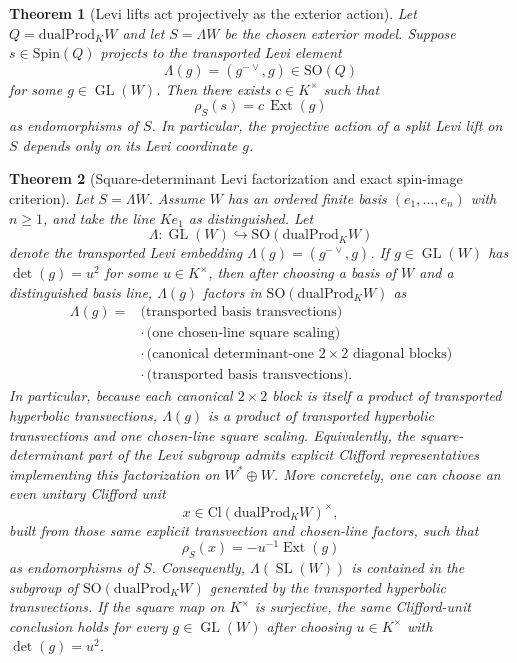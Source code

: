 \documentclass{birkjour}
\theoremstyle{plain}
\newtheorem{theorem}{Theorem}[section]
\theoremstyle{definition}
\theoremstyle{remark}
\newcommand{\Cl}{\mathrm{Cl}}
\newcommand{\Spin}{\mathrm{Spin}}
\newcommand{\SO}{\mathrm{SO}}
\newcommand{\dualProd}{\mathrm{dualProd}}
\newcommand{\ExtMap}{\operatorname{Ext}}
\newcommand{\wedgeW}{\Lambda W}
\begin{document}
\begin{theorem}[Levi lifts act projectively as the exterior action]
\label{thm:levi-projective-exterior}
Let $Q=\dualProd_K W$ and let $S=\wedgeW$ be the chosen exterior model.
Suppose $s\in \Spin(Q)$ projects to the transported Levi element
\[
  \Lambda(g)=(g^{-{\vee}},g)\in \SO(Q)
\]
for some $g\in \operatorname{GL}(W)$. Then there exists $c\in K^\times$ such that
\[
  \rho_S(s)=c\,\ExtMap(g)
\]
as endomorphisms of $S$. In particular, the projective action of a split Levi
lift on $S$ depends only on its Levi coordinate $g$.
\end{theorem}

\begin{theorem}[Square-determinant Levi factorization and exact spin-image criterion]
\label{thm:square-det-levi}
Let $S=\wedgeW$. Assume $W$ has an ordered finite basis
$(e_1,\ldots,e_n)$ with $n\ge 1$, and take the line $K e_1$ as distinguished.
Let
\[
  \Lambda:\operatorname{GL}(W)\hookrightarrow \SO(\dualProd_K W)
\]
denote the transported Levi embedding $\Lambda(g)=(g^{-{\vee}},g)$. If
$g\in \operatorname{GL}(W)$ has $\det(g)=u^2$ for some $u\in K^\times$, then
after choosing a basis of $W$ and a distinguished basis line, $\Lambda(g)$
factors in
$\SO(\dualProd_K W)$ as
\[
  \begin{aligned}
  \Lambda(g) ={}&
    \text{(transported basis transvections)} \\
    &\cdot\, \text{(one chosen-line square scaling)} \\
    &\cdot\, \text{(canonical determinant-one $2\times 2$ diagonal blocks)} \\
    &\cdot\, \text{(transported basis transvections)}.
  \end{aligned}
\]
In particular, because each canonical $2\times2$ block is itself a product of
transported hyperbolic transvections, $\Lambda(g)$ is a product of transported
hyperbolic transvections and one chosen-line square scaling. Equivalently, the
square-determinant part of the Levi subgroup admits explicit Clifford
representatives implementing this factorization on $W^*\oplus W$. More
concretely,
one can choose an even unitary Clifford unit
\[
  x\in \Cl(\dualProd_K W)^\times,
\]
built from those same explicit transvection and chosen-line factors, such that
\[
  \rho_S(x)=-u^{-1}\ExtMap(g)
\]
as endomorphisms of $S$. Consequently, $\Lambda(\operatorname{SL}(W))$ is
contained in the subgroup of
$\SO(\dualProd_K W)$ generated by the transported hyperbolic transvections.
If the square map on $K^\times$ is surjective, the same Clifford-unit conclusion
holds for every $g\in\operatorname{GL}(W)$ after choosing
$u\in K^\times$ with $\det(g)=u^2$.


\end{theorem}
\end{document}
